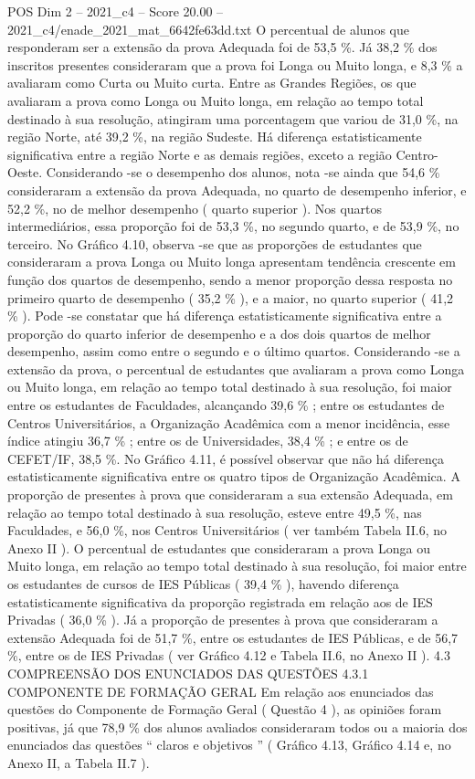\begin{textsample}{POS Dim 2 – 2021\_c4 – Score 20.00 – 2021\_c4/enade\_2021\_mat\_6642fe63dd.txt}
O percentual de alunos que responderam ser a extensão da prova Adequada foi de 53,5 \%.
Já 38,2 \% dos inscritos presentes consideraram que a prova foi Longa ou Muito longa, e 8,3 \% a avaliaram como Curta ou Muito curta.
Entre as Grandes Regiões, os que avaliaram a prova como Longa ou Muito longa, em relação ao tempo total destinado à sua resolução, atingiram uma porcentagem que variou de 31,0 \%, na região Norte, até 39,2 \%, na região Sudeste.
Há diferença estatisticamente significativa entre a região Norte e as demais regiões, exceto a região Centro-Oeste.
Considerando -se o desempenho dos alunos, nota -se ainda que 54,6 \% consideraram a extensão da prova Adequada, no quarto de desempenho inferior, e 52,2 \%, no de melhor desempenho ( quarto superior ).
Nos quartos intermediários, essa proporção foi de 53,3 \%, no segundo quarto, e de 53,9 \%, no terceiro.
No Gráfico 4.10, observa -se que as proporções de estudantes que consideraram a prova Longa ou Muito longa apresentam tendência crescente em função dos quartos de desempenho, sendo a menor proporção dessa resposta no primeiro quarto de desempenho ( 35,2 \% ), e a maior, no quarto superior ( 41,2 \% ).
Pode -se constatar que há diferença estatisticamente significativa entre a proporção do quarto inferior de desempenho e a dos dois quartos de melhor desempenho, assim como entre o segundo e o último quartos.
Considerando -se a extensão da prova, o percentual de estudantes que avaliaram a prova como Longa ou Muito longa, em relação ao tempo total destinado à sua resolução, foi maior entre os estudantes de Faculdades, alcançando 39,6 \% ; entre os estudantes de Centros Universitários, a Organização Acadêmica com a menor incidência, esse índice atingiu 36,7 \% ; entre os de Universidades, 38,4 \% ; e entre os de CEFET/IF, 38,5 \%.
No Gráfico 4.11, é possível observar que não há diferença estatisticamente significativa entre os quatro tipos de Organização Acadêmica.
A proporção de presentes à prova que consideraram a sua extensão Adequada, em relação ao tempo total destinado à sua resolução, esteve entre 49,5 \%, nas Faculdades, e 56,0 \%, nos Centros Universitários ( ver também Tabela II.6, no Anexo II ).
O percentual de estudantes que consideraram a prova Longa ou Muito longa, em relação ao tempo total destinado à sua resolução, foi maior entre os estudantes de cursos de IES Públicas ( 39,4 \% ), havendo diferença estatisticamente significativa da proporção registrada em relação aos de IES Privadas ( 36,0 \% ).
Já a proporção de presentes à prova que consideraram a extensão Adequada foi de 51,7 \%, entre os estudantes de IES Públicas, e de 56,7 \%, entre os de IES Privadas ( ver Gráfico 4.12 e Tabela II.6, no Anexo II ). 4.3 COMPREENSÃO DOS ENUNCIADOS DAS QUESTÕES 4.3.1 COMPONENTE DE FORMAÇÃO GERAL Em relação aos enunciados das questões do Componente de Formação Geral ( Questão 4 ), as opiniões foram positivas, já que 78,9 \% dos alunos avaliados consideraram todos ou a maioria dos enunciados das questões “ claros e objetivos ” ( Gráfico 4.13, Gráfico 4.14 e, no Anexo II, a Tabela II.7 ).

\end{textsample}

